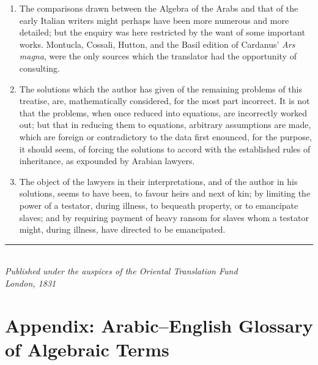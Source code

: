 \begin{enumerate}
\item The comparisons drawn between the Algebra of the Arabs and that of the early Italian writers might perhaps have been more numerous and more detailed; but the enquiry was here restricted by the want of some important works. Montucla, Cossali, Hutton, and the Basil edition of Cardanus' \textit{Ars magna}, were the only sources which the translator had the opportunity of consulting.

\item The solutions which the author has given of the remaining problems of this treatise, are, mathematically considered, for the most part incorrect. It is not that the problems, when once reduced into equations, are incorrectly worked out; but that in reducing them to equations, arbitrary assumptions are made, which are foreign or contradictory to the data first enounced, for the purpose, it should seem, of forcing the solutions to accord with the established rules of inheritance, as expounded by Arabian lawyers.

\item The object of the lawyers in their interpretations, and of the author in his solutions, seems to have been, to favour heirs and next of kin; by limiting the power of a testator, during illness, to bequeath property, or to emancipate slaves; and by requiring payment of heavy ransom for slaves whom a testator might, during illness, have directed to be emancipated.

\end{enumerate}

\vspace{1cm}
\begin{center}
\rule{0.5\textwidth}{1pt}\\[0.5cm]
{\small\textit{Published under the auspices of the Oriental Translation Fund\\London, 1831}}
\end{center}

\clearpage

\section*{Appendix: Arabic--English Glossary of Algebraic Terms}

